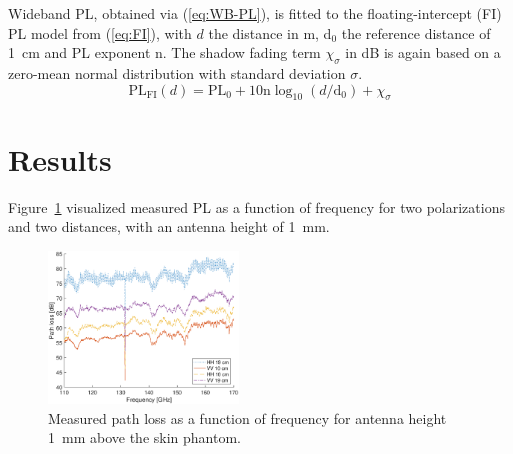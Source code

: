 \documentclass[preprint]{rsl}
\begin{document}
Wideband PL, obtained via (\ref{eq:WB-PL}), is fitted to the floating-intercept (FI) PL model from (\ref{eq:FI}), with $d$ the distance in m, d$_0$ the reference distance of 1~cm and PL exponent n. 
The shadow fading term $\chi_\sigma$ in dB is again based on a zero-mean normal distribution with standard deviation $\sigma$. 
\begin{equation}
  \text{PL}_{\text{FI}}(d) = \text{PL}_0 + 10 \text{n} \log_{10} (d/\text{d}_0) + \chi_\sigma
  \label{eq:FI}
\end{equation}

\section{Results\label{sect:results}}

Figure~\ref{fig:PL_vs_freq} visualized measured PL as a function of frequency for two polarizations and two distances, with an antenna height of 1~mm.
\begin{figure}[tb]
\begin{center}
	\includegraphics[width=0.45\textwidth]{figures/PL_vs_freq}
\caption{Measured path loss as a function of frequency for antenna height 1~mm above the skin phantom.}
\label{fig:PL_vs_freq}
\end{center}
\end{figure}
\end{document}
